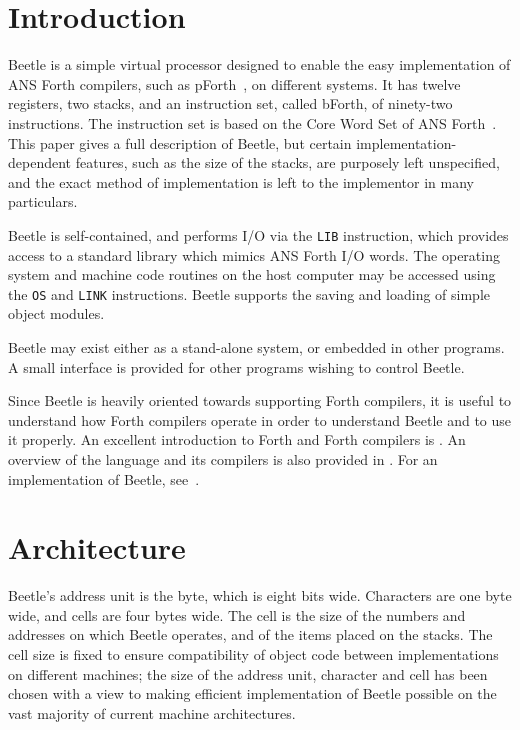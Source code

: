 %
%
%
%


\section{Introduction}

Beetle is a simple virtual processor designed to enable the easy implementation
of ANS Forth compilers, such as pForth~\cite{beetledis}, on different systems.
It has twelve registers, two stacks, and an instruction set, called bForth, of
ninety-two instructions. The instruction set is based on the Core Word Set of
ANS Forth~\cite{ANSIforth}. This paper gives a full description of Beetle, but
certain implementation-dependent features, such as the size of the stacks, are
purposely left unspecified, and the exact method of implementation is left to
the implementor in many particulars.

Beetle is self-contained, and performs I/O via the {\tt LIB} instruction, which
provides access to a standard library which mimics ANS Forth I/O words. The
operating system and machine code routines on the host computer may be accessed
using the {\tt OS} and {\tt LINK} instructions. Beetle supports the saving and
loading of simple object modules.

Beetle may exist either as a stand-alone system, or embedded in other programs.
A small interface is provided for other programs wishing to control Beetle.

Since Beetle is heavily oriented towards supporting Forth compilers, it is
useful to understand how Forth compilers operate in order to understand Beetle
and to use it properly. An excellent introduction to Forth and Forth compilers
is \cite{starting4th}. An overview of the language and its compilers is also
provided in \cite{ANSIforth}. For an implementation of Beetle, see~\cite{beetledis}.


\section{Architecture}

Beetle's address unit is the byte, which is eight bits wide. Characters are one
byte wide, and cells are four bytes wide. The cell is the size of the numbers
and addresses on which Beetle operates, and of the items placed on the stacks.
The cell size is fixed to ensure compatibility of object code between
implementations on different machines; the size of the address unit, character
and cell has been chosen with a view to making efficient implementation of
Beetle possible on the vast majority of current machine architectures.

